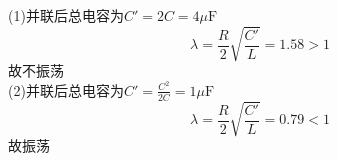 \documentclass{phyasgn}
\begin{document}
\begin{sol}[5-33]
    (1)并联后总电容为$C'=2C=4\mu\text{F}$
    $$\lambda=\frac{R}{2}\sqrt{\frac{C'}{L}}=1.58>1$$
    故不振荡\\
    (2)并联后总电容为$C'=\frac{C^2}{2C}=1\mu\text{F}$
    $$\lambda=\frac{R}{2}\sqrt{\frac{C'}{L}}=0.79<1$$
    故振荡
\end{sol}\par
\end{document}
